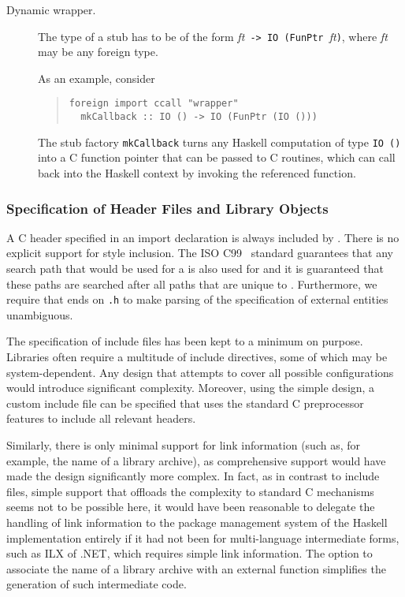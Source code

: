 \documentclass[a4paper,twoside]{article}
\newcommand{\code}[1]{\texttt{#1}}      %
\begin{document}
\begin{description}
\item[Dynamic wrapper.]  The type of a  stub has to be of the
  form \textit{ft}\code{ -> }\code{IO (FunPtr }\textit{ft}\code), where
  \textit{ft} may be any foreign type.

  As an example, consider
  \begin{quote}
\begin{verbatim}
foreign import ccall "wrapper" 
  mkCallback :: IO () -> IO (FunPtr (IO ()))
\end{verbatim}
  \end{quote}
  The stub factory \code{mkCallback} turns any Haskell computation of type
  \code{IO ()} into a C function pointer that can be passed to C routines,
  which can call back into the Haskell context by invoking the referenced
  function.

\end{description}

\subsubsection{Specification of Header Files and Library Objects}

A C header specified in an import declaration is always included by
.  There is no explicit support for
 style inclusion.  The ISO C99~\cite{C99}
standard guarantees that any search path that would be used for a
 is also used for  and it is guaranteed that these paths are searched after
all paths that are unique to .  Furthermore,
we require that  ends on \code{.h} to make parsing of the
specification of external entities unambiguous.
  
The specification of include files has been kept to a minimum on purpose.
Libraries often require a multitude of include directives, some of which may
be system-dependent.  Any design that attempts to cover all possible
configurations would introduce significant complexity.  Moreover, using the
simple design, a custom include file can be specified that uses the standard C
preprocessor features to include all relevant headers.
  
Similarly, there is only minimal support for link information (such as, for
example, the name of a library archive), as comprehensive support would have
made the design significantly more complex.  In fact, as in contrast to
include files, simple support that offloads the complexity to standard C
mechanisms seems not to be possible here, it would have been reasonable to
delegate the handling of link information to the package management system of
the Haskell implementation entirely if it had not been for multi-language
intermediate forms, such as ILX of .NET, which requires simple link
information.  The option to associate the name of a library archive with an
external function simplifies the generation of such intermediate code.
\end{document}
